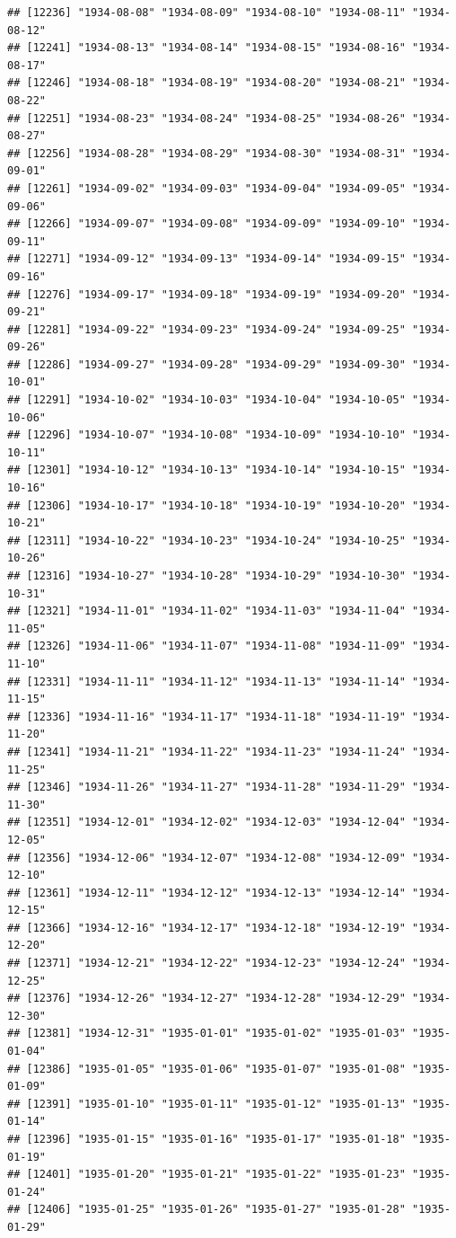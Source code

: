 \documentclass{article}\usepackage[]{graphicx}\usepackage[]{color}
\makeatletter
\newenvironment{kframe}{%
 \def\at@end@of@kframe{}%
 \ifinner\ifhmode%
  \def\at@end@of@kframe{\end{minipage}}%
  \begin{minipage}{\columnwidth}%
 \fi\fi%
 \def\FrameCommand##1{\hskip\@totalleftmargin \hskip-\fboxsep
 \colorbox{shadecolor}{##1}\hskip-\fboxsep
     \hskip-\linewidth \hskip-\@totalleftmargin \hskip\columnwidth}%
 \MakeFramed {\advance\hsize-\width
   \@totalleftmargin\z@ \linewidth\hsize
   \@setminipage}}%
 {\par\unskip\endMakeFramed%
 \at@end@of@kframe}
\newenvironment{knitrout}{}{} %
\makeatother
\begin{document}
\begin{description}
\begin{knitrout}
\begin{kframe}
\begin{verbatim}
## [12236] "1934-08-08" "1934-08-09" "1934-08-10" "1934-08-11" "1934-08-12"
## [12241] "1934-08-13" "1934-08-14" "1934-08-15" "1934-08-16" "1934-08-17"
## [12246] "1934-08-18" "1934-08-19" "1934-08-20" "1934-08-21" "1934-08-22"
## [12251] "1934-08-23" "1934-08-24" "1934-08-25" "1934-08-26" "1934-08-27"
## [12256] "1934-08-28" "1934-08-29" "1934-08-30" "1934-08-31" "1934-09-01"
## [12261] "1934-09-02" "1934-09-03" "1934-09-04" "1934-09-05" "1934-09-06"
## [12266] "1934-09-07" "1934-09-08" "1934-09-09" "1934-09-10" "1934-09-11"
## [12271] "1934-09-12" "1934-09-13" "1934-09-14" "1934-09-15" "1934-09-16"
## [12276] "1934-09-17" "1934-09-18" "1934-09-19" "1934-09-20" "1934-09-21"
## [12281] "1934-09-22" "1934-09-23" "1934-09-24" "1934-09-25" "1934-09-26"
## [12286] "1934-09-27" "1934-09-28" "1934-09-29" "1934-09-30" "1934-10-01"
## [12291] "1934-10-02" "1934-10-03" "1934-10-04" "1934-10-05" "1934-10-06"
## [12296] "1934-10-07" "1934-10-08" "1934-10-09" "1934-10-10" "1934-10-11"
## [12301] "1934-10-12" "1934-10-13" "1934-10-14" "1934-10-15" "1934-10-16"
## [12306] "1934-10-17" "1934-10-18" "1934-10-19" "1934-10-20" "1934-10-21"
## [12311] "1934-10-22" "1934-10-23" "1934-10-24" "1934-10-25" "1934-10-26"
## [12316] "1934-10-27" "1934-10-28" "1934-10-29" "1934-10-30" "1934-10-31"
## [12321] "1934-11-01" "1934-11-02" "1934-11-03" "1934-11-04" "1934-11-05"
## [12326] "1934-11-06" "1934-11-07" "1934-11-08" "1934-11-09" "1934-11-10"
## [12331] "1934-11-11" "1934-11-12" "1934-11-13" "1934-11-14" "1934-11-15"
## [12336] "1934-11-16" "1934-11-17" "1934-11-18" "1934-11-19" "1934-11-20"
## [12341] "1934-11-21" "1934-11-22" "1934-11-23" "1934-11-24" "1934-11-25"
## [12346] "1934-11-26" "1934-11-27" "1934-11-28" "1934-11-29" "1934-11-30"
## [12351] "1934-12-01" "1934-12-02" "1934-12-03" "1934-12-04" "1934-12-05"
## [12356] "1934-12-06" "1934-12-07" "1934-12-08" "1934-12-09" "1934-12-10"
## [12361] "1934-12-11" "1934-12-12" "1934-12-13" "1934-12-14" "1934-12-15"
## [12366] "1934-12-16" "1934-12-17" "1934-12-18" "1934-12-19" "1934-12-20"
## [12371] "1934-12-21" "1934-12-22" "1934-12-23" "1934-12-24" "1934-12-25"
## [12376] "1934-12-26" "1934-12-27" "1934-12-28" "1934-12-29" "1934-12-30"
## [12381] "1934-12-31" "1935-01-01" "1935-01-02" "1935-01-03" "1935-01-04"
## [12386] "1935-01-05" "1935-01-06" "1935-01-07" "1935-01-08" "1935-01-09"
## [12391] "1935-01-10" "1935-01-11" "1935-01-12" "1935-01-13" "1935-01-14"
## [12396] "1935-01-15" "1935-01-16" "1935-01-17" "1935-01-18" "1935-01-19"
## [12401] "1935-01-20" "1935-01-21" "1935-01-22" "1935-01-23" "1935-01-24"
## [12406] "1935-01-25" "1935-01-26" "1935-01-27" "1935-01-28" "1935-01-29"

\end{verbatim}
\end{kframe}
\end{knitrout}
\end{description}
\end{document}

